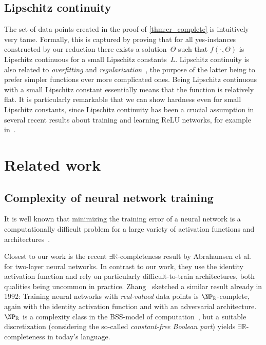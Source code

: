 \documentclass[11pt]{article}
\numberwithin{equation}{section}
\theoremstyle{definition}
\theoremstyle{plain}
\newcommand{\R}{\mathbb R}
\newcommand{\ER}{\texorpdfstring{\ensuremath{\exists\R}}{ER}\xspace}
\newcommand{\twolayer}{two-layer\xspace}
\newcommand{\ReLU}{\ensuremath{\mathrm{ReLU}}\xspace}
\theoremstyle{plain}
\begin{document}

\subsection{Lipschitz continuity}
The set of data points created in the proof of \cref{thm:er_complete} is intuitively very tame.
Formally, this is captured by proving that for all yes-instances constructed by our reduction there exists a solution~$\Theta$ such that $f(\cdot, \Theta)$ is Lipschitz continuous for a small Lipschitz %
constants~$L$.  %
Lipschitz continuity is also related to \emph{overfitting} and \emph{regularization}~\cite{Gouk2021_Regularisation}, the purpose of the latter being to prefer simpler functions over more complicated ones.
Being Lipschitz continuous with a small Lipschitz constant
essentially means that the function is relatively flat.
It is particularly remarkable that we can show hardness even for small Lipschitz constants, since Lipschitz continuity has been a crucial assumption in several recent results about training and learning \ReLU networks, for example in~\cite{Bienstock2023_LinearProgramming, Chen2022_LearningFTP, Goel2017_ReliablyLearning, bubeck2023universal}.
%


\section{Related work}
\label{sec:related_work}

\subsection{Complexity of neural network training}
It is %
well known  %
that minimizing the training error of a neural network is a computationally difficult problem for a large variety of activation functions and architectures~\cite{Shalev2014_UnderstandingML}.

Closest to our work is the recent \ER-completeness result by Abrahamsen et al.~\cite{Abrahamsen2021_NeuralNetworks} for \twolayer neural networks.
In contrast to our work, they use the identity activation function and rely on particularly
%
difficult-to-train  %
architectures, both qualities being uncommon in practice.
Zhang~\cite{Zhang1992_BSS} sketched a similar result already in 1992:
Training neural networks with \emph{real-valued} data points is $\NP_\R$-complete, again with the identity activation function and with an adversarial architecture.
$\NP_\R$ is a complexity class in the BSS-model of computation~\cite{Blum1989_ComputationOverTheReals}, but a suitable discretization (considering the so-called \emph{constant-free Boolean part}) yields \ER-completeness in today's language.
\end{document}
